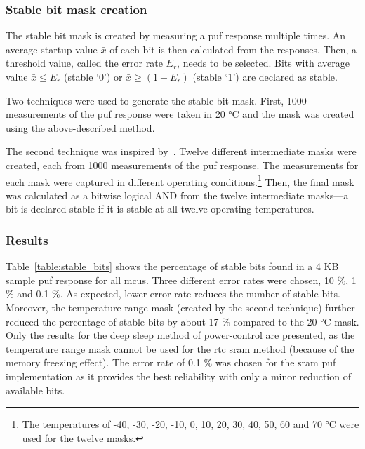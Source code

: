 \subsubsection*{Stable bit mask creation}

The stable bit mask is created by measuring a \gls{puf} response multiple times. An average startup value $\bar{x}$ of each bit is then calculated from the responses. Then, a threshold value, called the error rate $E_r$, needs to be selected. Bits with average value $\bar{x} \leq E_r$ (stable `0') or $\bar{x} \geq (1-E_r)$ (stable `1') are declared as stable.

Two techniques were used to generate the stable bit mask. First, 1000 measurements of the \gls{puf} response were taken in 20 °C and the mask was created using the above-described method.

The second technique was inspired by~\cite{Hanova2020}. Twelve different intermediate masks were created, each from 1000 measurements of the \gls{puf} response. The measurements for each mask were captured in different operating conditions.\footnote{The temperatures of -40, -30, -20, -10, 0, 10, 20, 30, 40, 50, 60 and 70 °C were used for the twelve masks.} Then, the final mask was calculated as a bitwise logical AND from the twelve intermediate masks---a bit is declared stable if it is stable at all twelve operating temperatures.

\subsubsection*{Results}

Table~\ref{table:stable_bits} shows the percentage of stable bits found in a 4 KB sample \gls{puf} response for all \glspl{mcu}. Three different error rates were chosen, 10 \%, 1 \% and 0.1 \%. As expected, lower error rate reduces the number of stable bits. Moreover, the temperature range mask (created by the second technique) further reduced the percentage of stable bits by about 17 \% compared to the 20 °C mask. Only the results for the deep sleep method of power-control are presented, as the temperature range mask cannot be used for the \gls{rtc} \gls{sram} method (because of the memory freezing effect). The error rate of 0.1 \% was chosen for the \gls{sram} \gls{puf} implementation as it provides the best reliability with only a minor reduction of available bits.

